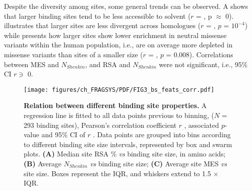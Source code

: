 Despite the diversity among sites, some general trends can be observed. A shows that larger binding sites tend to be less accessible to solvent ($r$ = , p $\approx$ 0).  illustrates that larger sites are less divergent across homologues ($r$ = , $p$ = $10^{-4}$) while  presents how larger sites show lower enrichment in neutral missense variants within the human population, i.e., are on average more depleted in missense variants than sites of a smaller size ($r$ = , $p$ = 0.008). Correlations between MES and $N_{Shenkin}$, and RSA and $N_{Shenkin}$ were not significant, i.e., 95\% CI $r \ni$ 0.

\begin{figure}[ht!]
    \centering
    \texttt{[image: figures/ch\_FRAGSYS/PDF/FIG3\_bs\_feats\_corr.pdf]}
    \caption[Relation between different binding site properties]{\textbf{Relation between different binding site properties.} A regression line is fitted to all data points previous to binning, ($N$ = 293 binding sites), Pearson’s correlation coefficient $r$ \cite{RODGERS_1988_CORRELATION}, associated $p$-value and 95\% CI of $r$ \cite{BOWLEY_1928_R_CI}. Data points are grouped into bins according to different binding site size intervals, represented by box and swarm plots. \textbf{(A)} Median site RSA \% \textit{vs} binding site size, in amino acids; \textbf{(B)} Average $N_{Shenkin}$ \textit{vs} binding site size; \textbf{(C)} Average site MES \textit{vs} site size. Boxes represent the IQR, and whiskers extend to 1.5 $\times$ IQR.}
    \label{fig:bss_feats_corr}
\end{figure}


